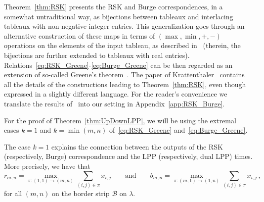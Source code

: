 \documentclass[a4paper,reqno,12pt]{amsart}
\theoremstyle{plain}
\theoremstyle{definition}
\newcommand{\1}{\mathbbm{1}}
\newcommand{\Fro}{\mathcal{B}}
\begin{document}
Theorem~\ref{thm:RSK} presents the RSK and Burge correspondences, in a somewhat untraditional way, as bijections between tableaux and interlacing tableaux with non-negative integer entries.
This generalization goes through an alternative construction of these maps in terms of $(\max, \min,+,-)$ operations on the elements of the input tableau, as described in~\cite[\S~2]{bisiOConnellZygouras20} (therein, the bijections are further extended to tableaux with real entries).
Relations~\eqref{eq:RSK_Greene}-\eqref{eq:Burge_Greene} can be then regarded as an extension of so-called Greene's theorem~\cite{greene74}.
The paper of Krattenthaler~\cite{krattenthaler06} contains all the details of the constructions leading to Theorem~\ref{thm:RSK}, even though expressed in a slightly different language.
For the reader's convenience we translate the results of~\cite{krattenthaler06} into our setting in Appendix~\ref{app:RSK_Burge}.

For the proof of Theorem~\ref{thm:UpDownLPP}, we will be  using the extremal cases $k=1$ and $k=\min(m,n)$ of~\eqref{eq:RSK_Greene} and~\eqref{eq:Burge_Greene}.

The case $k=1$ explains the connection between the outputs of the RSK (respectively, Burge) correspondence and the LPP (respectively, dual LPP) times.
More precisely, we have that
\begin{equation}
\label{eq:LPP_RSK_Burge}
r_{m,n}
= \max_{\pi\colon (1,1) \to (m,n)} \sum_{(i,j)\in \pi} x_{i,j}
\qquad \text{and} \qquad
b_{m,n}
= \max_{\pi\colon (m,1) \to (1,n)} \sum_{(i,j)\in \pi} x_{i,j} \, ,
\end{equation}
for all $(m,n)$ on the border strip $\Fro$ on $\lambda$.
\end{document}
